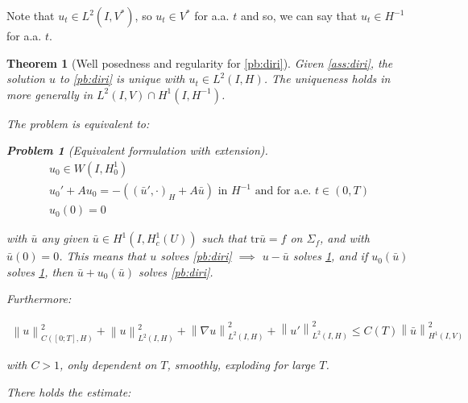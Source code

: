 \documentclass[english,a4paper,12pt,oneside]{scrbook}
\theoremstyle{break}
\newtheorem{thm}[equation]{Theorem}
\newtheorem{pb}[equation]{Problem}
\theoremstyle{remark}
\newcommand{\norm}[1]{\left\lVert#1\right\rVert}
\newcommand{\tr}{\text{tr}}
\begin{document}
Note that $u_t \in L^2(I, V^*)$, so $u_t \in V^*$ for a.a. $t$ and so, we can say that $u_t \in H^{-1}$ for a.a. $t$.

\begin{thm}[Well posedness and regularity for \cref{pb:diri}]
Given \cref{ass:diri}, the solution $u$ to \cref{pb:diri} is unique with $u_t \in L^2(I,H)$. The uniqueness holds in more generally in $L^2(I,V)\cap H^1(I, H^{-1})$.

The problem is equivalent to:

\begin{pb}[Equivalent formulation with extension]
\label{pb:diri_ext}
\begin{align}
u_0 \in W(I,H^1_0) \\
u_0' + A u_0 = -((\bar{u}',\cdot)_H+A \bar{u}) \text{ in }H^{-1} \text{ and for a.e. } t \in (0,T) \\
u_0(0)=0
\end{align}
\end{pb}

with $\bar{u}$ any given $\bar{u}\in H^1(I,H^1_c(U))$ such that $\tr \bar{u} =f$ on $\Sigma_f$, and with $\bar{u}(0)=0$. This means that $u$ solves \cref{pb:diri} $\implies$ $u-\bar{u}$ solves \cref{pb:diri_ext}, and if $u_0(\bar{u})$ solves  \cref{pb:diri_ext}, then $\bar{u}+u_0(\bar{u})$ solves \cref{pb:diri}.

Furthermore: 

\begin{align}
\norm{u}^2_{C([0;T],H)}+\norm{u}_{L^2(I,H)}^2+ \norm{\nabla u}_{L^2(I,H)}^2 + \norm{u'}^2_{L^2(I,H)}\leq C(T)\norm{\bar{u}}_{H^1(I,V)}^2
\end{align}

with $C>1$, only dependent on $T$, smoothly, exploding for large $T$.


There holds the estimate:
\end{thm}
\end{document}
